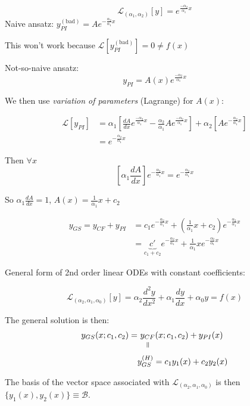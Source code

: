 \documentclass[twoside]{scrartcl}
\begin{document}
\begin{example}
\[\mathcal{L}_{(\alpha_1,\alpha_2)}[y] = e^{\frac{-\alpha_2}{\alpha_1}x}\]	
Naive ansatz: $y_{PI}^{(\mathrm{bad})} = Ae^{-\frac{\alpha_2}{\alpha_1}x}$

This won't work because $\mathcal{L}[y_{PI}^{(\mathrm{bad})}] = 0 \neq f(x)$

Not-so-naive ansatz: 
\[y_{PI} = A(x)e^{\frac{-\alpha_2}{\alpha_1}x}\]

We then use \emph{variation of parameters} (Lagrange) for $A(x)$: 

\[
\begin{aligned}
  \mathcal{L}[y_{PI}] &= \alpha_1\left[\frac{dA}{dx}e^{\frac{-\alpha_2}{\alpha_1}x} - \frac{\alpha_2}{\alpha_1}Ae^{\frac{-\alpha_2}{\alpha_1}x}\right] + \alpha_2\left[Ae^{-\frac{\alpha_2}{\alpha_1}x}\right]\\
  &= e^{-\frac{\alpha_2}{\alpha_1}x}
\end{aligned}
\]

Then $\forall x$ 
\[\left[\alpha_1\frac{dA}{dx}\right]e^{-\frac{\alpha_2}{\alpha_1}x} = e^{-\frac{\alpha_2}{\alpha_1}x}\]

So $\alpha_1\frac{dA}{dx} = 1$, $A(x) = \frac{1}{\alpha_1}x + c_2$

\[
\begin{aligned}
  y_{GS} = y_{CF} + y_{PI} &= c_1e^{-\frac{\alpha_2}{\alpha_1}x} + \left(\frac{1}{\alpha_1}x + c_2\right)e^{-\frac{\alpha_2}{\alpha_1}x}\\
  &= \underbrace{c'}_{c_1 + c_2}e^{-\frac{\alpha_2}{\alpha_1}x} + \frac{1}{\alpha_1}xe^{-\frac{\alpha_2}{\alpha_1}x}
\end{aligned}
\]
\end{example}\vspace*{5pt}

General form of 2nd order linear ODEs with constant coefficients:

\[\mathcal{L}_{(\alpha_2,\alpha_1,\alpha_0)}[y] = \alpha_2\frac{d^2y}{dx^2} + \alpha_1\frac{dy}{dx} + \alpha_0y = f(x)\]

The general solution is then:
\[
\begin{aligned}
  y_{GS}(x;c_1,c_2) = &~\equalto{y_{CF}}{}(x;c_1,c_2) + y_{PI}(x)\\
  &y_{GS}^{(H)} = c_1y_1(x) + c_2y_2(x)
\end{aligned}
\]

The basis of the vector space associated with $\mathcal{L}_{(\alpha_2,\alpha_1,\alpha_0)}$ is then $\{y_1(x),y_2(x)\} \equiv \mathcal{B}$. 
\end{document}

